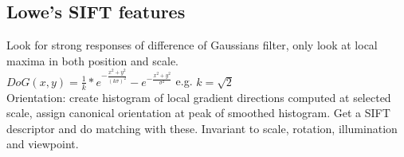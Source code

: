 \subsection*{Lowe's SIFT features}
Look for strong responses of difference of Gaussians  filter, only look at local maxima in both position and scale.\\
 $DoG(x, y) = \frac{1}{k}* e^{-\frac{x^{2} + y^{2}}{(k\sigma)^{2}}} - e^{-\frac{x^{2} + y^{2}}{\sigma^{2}}}$ e.g. $k = \sqrt{2}$\\
Orientation: create histogram of local gradient directions computed at selected scale, assign canonical orientation at peak of smoothed histogram. Get a SIFT descriptor  and do matching with these. Invariant to scale, rotation, illumination and viewpoint.
